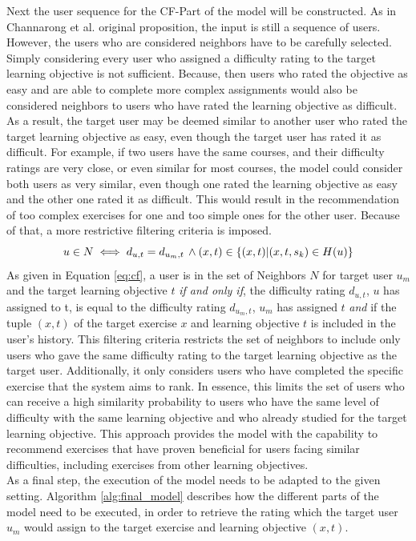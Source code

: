\documentclass{Academic}
\begin{document}
        Next the user sequence for the CF-Part of the model will be constructed. As in Channarong et al. original proposition, the input is still a sequence of users. However, the users who are considered neighbors have to be carefully selected. Simply considering every user who assigned a difficulty rating to the target learning objective is not sufficient. Because, then users who rated the objective as easy and are able to complete more complex assignments would also be considered neighbors to users who have rated the learning objective as difficult. As a result, the target user may be deemed similar to another user who rated the target learning objective as easy, even though the target user has rated it as difficult. For example, if two users have the same courses, and their difficulty ratings are very close, or even similar for most courses, the model could consider both users as very similar, even though one rated the learning objective as easy and the other one rated it as difficult. This would result in the recommendation of too complex exercises for one and too simple ones for the other user. Because of that, a more restrictive filtering criteria is imposed.
        \begin{equation}\label{eq:cf}
            u \in N \iff d_{u, t} = d_{u_m, t} \text{\,} \wedge (x, t) \in \{(x,t)|(x,t,s_k) \in H(u)\}
        \end{equation}
        As given in Equation \ref{eq:cf}, a user is in the set of Neighbors $N$ for target user $u_m$ and the target learning objective $t$ \textit{if and only if}, the difficulty rating $d_{u,t}$, $u$ has assigned to t, is equal to the difficulty rating $d_{u_m, t}$, $u_m$ has assigned $t$ \textit{and} if the tuple $(x,t)$ of the target exercise $x$ and learning objective $t$ is included in the user's history. This filtering criteria restricts the set of neighbors to include only users who gave the same difficulty rating to the target learning objective as the target user. Additionally, it only considers users who have completed the specific exercise that the system aims to rank. In essence, this limits the set of users who can receive a high similarity probability to users who have the same level of difficulty with the same learning objective and who already studied for the target learning objective. This approach provides the model with the capability to recommend exercises that have proven beneficial for users facing similar difficulties, including exercises from other learning objectives.\\
        As a final step, the execution of the model needs to be adapted to the given setting. Algorithm \ref{alg:final_model} describes how the different parts of the model need to be executed, in order to retrieve the rating which the target user $u_m$ would assign to the target exercise and learning objective $(x,t)$.
\end{document}
